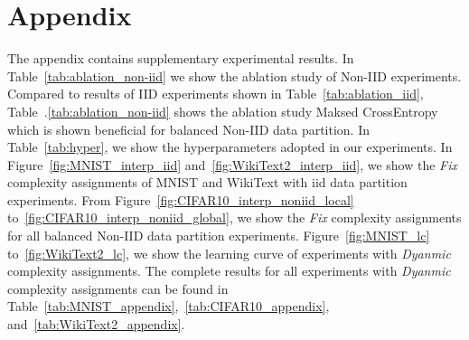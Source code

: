 \documentclass{article} %
\begin{document}
\section{Appendix}
The appendix contains supplementary experimental results. In Table~\ref{tab:ablation_non-iid} we show the ablation study of Non-IID experiments. Compared to results of IID experiments shown in Table~\ref{tab:ablation_iid}, Table~.\ref{tab:ablation_non-iid} shows the ablation study Maksed CrossEntropy which is shown beneficial for balanced Non-IID data partition. In Table~\ref{tab:hyper}, we show the hyperparameters adopted in our experiments. In Figure~\ref{fig:MNIST_interp_iid} and~\ref{fig:WikiText2_interp_iid}, we show the \textit{Fix} complexity assignments of MNIST and WikiText with iid data partition experiments. From Figure~\ref{fig:CIFAR10_interp_noniid_local} to~\ref{fig:CIFAR10_interp_noniid_global}, we show the \textit{Fix} complexity assignments for all balanced Non-IID data partition experiments. Figure~\ref{fig:MNIST_lc} to~\ref{fig:WikiText2_lc}, we show the learning curve of experiments with \textit{Dyanmic} complexity assignments. The complete results for all experiments with \textit{Dyanmic} complexity assignments can be found in Table~\ref{tab:MNIST_appendix},~\ref{tab:CIFAR10_appendix}, and~\ref{tab:WikiText2_appendix}.
\end{document}
